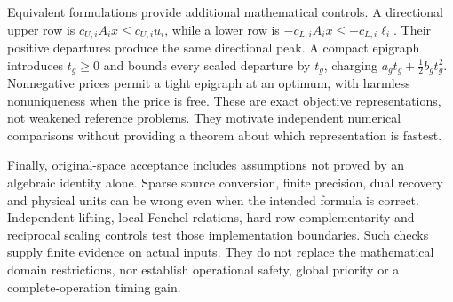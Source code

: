 Equivalent formulations provide additional mathematical controls. A
directional upper row is $c_{U,i}A_ix\leq c_{U,i}u_i$, while a lower
row is $-c_{L,i}A_ix\leq-c_{L,i}\ell_i$. Their positive departures
produce the same directional peak. A compact epigraph introduces
$t_g\geq0$ and bounds every scaled departure by $t_g$, charging
$a_gt_g+\tfrac12b_gt_g^2$. Nonnegative prices permit a tight epigraph
at an optimum, with harmless nonuniqueness when the price is free.
These are exact objective representations, not weakened reference
problems. They motivate independent numerical comparisons without
providing a theorem about which representation is fastest.

Finally, original-space acceptance includes assumptions not proved by
an algebraic identity alone. Sparse source conversion, finite precision,
dual recovery and physical units can be wrong even when the intended
formula is correct. Independent lifting, local Fenchel relations,
hard-row complementarity and reciprocal scaling controls test those
implementation boundaries. Such checks supply finite evidence on actual
inputs. They do not replace the mathematical domain restrictions, nor
establish operational safety, global priority or a complete-operation
timing gain.
